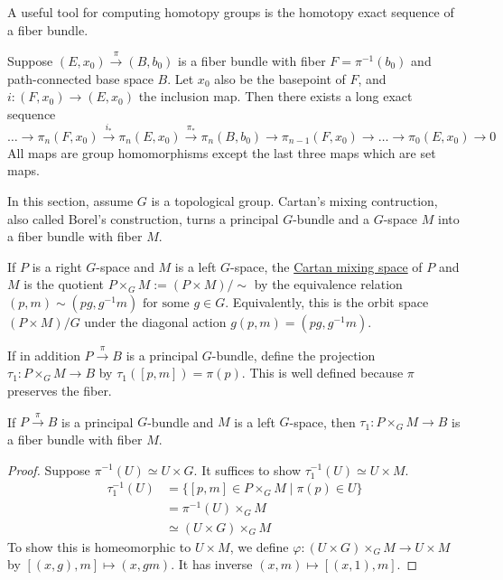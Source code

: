 A useful tool for computing homotopy groups is the homotopy exact sequence of a
fiber bundle. 
\begin{thm} \label{thm:fiber_les}
	Suppose $(E,x_0) \xrightarrow{\pi} (B,b_0)$ is a fiber bundle with fiber
	$F=\pi^{-1}(b_0)$ and path-connected base space $B$. Let  $x_0$ also be the
	basepoint of $F$, and  $i:(F,x_0)\to (E,x_0)$ the inclusion map. Then there
	exists a long exact sequence
	\[
		\ldots\to\pi_n(F,x_0) \xrightarrow{i_*}\pi_n(E,x_0)
		\xrightarrow{\pi_*}\pi_n(B,b_0)
		\to \pi_{n-1}(F,x_0)\to\ldots\to\pi_0(E,x_0)\to 0
	\] 
	All maps are group homomorphisms except the last three maps which are set
	maps.
\end{thm}

In this section, assume $G$ is a topological group. 
Cartan's mixing contruction, also
called Borel's construction, turns a principal  $G$-bundle and a  $G$-space  $M$
into a fiber bundle with fiber  $M$. 

If  $P$ is a right  $G$-space and  $M$ is a left  $G$-space, the 
\underline{Cartan mixing space} of  $P$ and  $M$ is the quotient 
$P\times_G M:= (P\times M) / \sim$ by the 
equivalence relation $(p,m)\sim (pg,g^{-1}m) \textrm{ for some }g\in G$.
Equivalently, this is the orbit space $(P\times M) /G$ under the diagonal action
$g(p,m) = (pg,g^{-1}m)$.

If in addition $P\xrightarrow{\pi} B$ is a principal $G$-bundle, define the projection
$\tau_1:P\times_GM\to B$ by $\tau_1([p,m])=\pi(p)$. This is well defined because
$\pi$ preserves the fiber.

\begin{prop} \label{prop:cartan_mixing}%
	If $P\xrightarrow{\pi} B$ is a principal  $G$-bundle and  $M$ is a left  $G$-space,
	then  $\tau_1 : P\times_G M\to B$ is a fiber bundle with fiber  $M$.
\end{prop}
\begin{proof}
	Suppose $\pi^{-1}(U)\simeq U\times G$. It suffices to show
	$\tau_1^{-1}(U)\simeq U\times M$. 
	\begin{align*}
		\tau_1^{-1}(U)
		&= \{[p,m]\in P\times_GM \mid \pi(p)\in U\} \\
		&= \pi^{-1}(U)\times _G M \\
		&\simeq (U\times G) \times_G M 
	\end{align*}
	To show this is homeomorphic to $U\times M$, we define 
	$\varphi:(U\times G) \times_G M \to U\times M$ by 
	$[(x,g),m] \mapsto (x,gm)$. It has inverse $(x,m)\mapsto [(x,1),m]$.
\end{proof}


